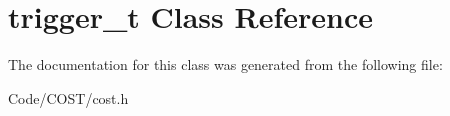 \hypertarget{classtrigger__t}{}\section{trigger\+\_\+t Class Reference}
\label{classtrigger__t}


The documentation for this class was generated from the following file\+:\begin{DoxyCompactItemize}
\item 
Code/\+C\+O\+S\+T/cost.\+h\end{DoxyCompactItemize}
